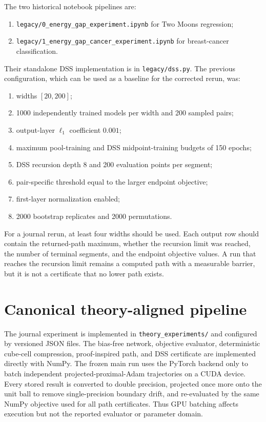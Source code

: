 \documentclass[11pt,a4paper]{article}
\begin{document}
The two historical notebook pipelines are:
\begin{enumerate}
\item \texttt{legacy/0\_energy\_gap\_experiment.ipynb} for Two Moons regression;
\item \texttt{legacy/1\_energy\_gap\_cancer\_experiment.ipynb} for breast-cancer classification.
\end{enumerate}
Their standalone DSS implementation is in \texttt{legacy/dss.py}. The previous configuration, which can be used as a baseline for the corrected rerun, was:
\begin{enumerate}
\item widths $[20,200]$;
\item 1000 independently trained models per width and 200 sampled pairs;
\item output-layer $\ell_1$ coefficient $0.001$;
\item maximum pool-training and DSS midpoint-training budgets of 150 epochs;
\item DSS recursion depth 8 and 200 evaluation points per segment;
\item pair-specific threshold equal to the larger endpoint objective;
\item first-layer normalization enabled;
\item 2000 bootstrap replicates and 2000 permutations.
\end{enumerate}

For a journal rerun, at least four widths should be used. Each output row should contain the returned-path maximum, whether the recursion limit was reached, the number of terminal segments, and the endpoint objective values. A run that reaches the recursion limit remains a computed path with a measurable barrier, but it is not a certificate that no lower path exists.

\section*{Canonical theory-aligned pipeline}

The journal experiment is implemented in \texttt{theory\_experiments/} and configured by versioned JSON files. The bias-free network, objective evaluator, deterministic cube-cell compression, proof-inspired path, and DSS certificate are implemented directly with NumPy. The frozen main run uses the PyTorch backend only to batch independent projected-proximal-Adam trajectories on a CUDA device. Every stored result is converted to double precision, projected once more onto the unit ball to remove single-precision boundary drift, and re-evaluated by the same NumPy objective used for all path certificates. Thus GPU batching affects execution but not the reported evaluator or parameter domain.
\end{document}
